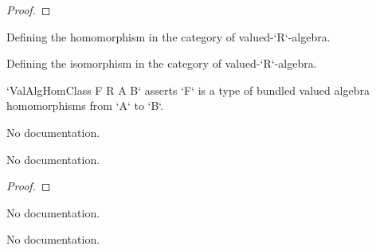 \begin{definition}
\begin{proof}
    \leanok
\end{proof}

\begin{definition}\label{ValAlgHom}
        \leanok
                Defining the homomorphism in the category of valued-`R`-algebra.
    \end{definition}

\begin{definition}\label{ValAlgEquiv}
        \leanok
                Defining the isomorphism in the category of valued-`R`-algebra.
    \end{definition}

\begin{definition}\label{ValAlgHomClass}
        \leanok
                `ValAlgHomClass F R A B` asserts `F` is a type of bundled valued algebra homomorphisms
from `A` to `B`.
    \end{definition}

\begin{definition}\label{ValAlgHom.ofAlgHomClassValRingHomClass}
        \leanok
                No documentation.
    \end{definition}

\begin{theorem}\label{comp_valAlgebraMap}
        \leanok
                No documentation.
    \end{theorem}

\begin{proof}
    \leanok
\end{proof}

\begin{definition}\label{ValAlgEquiv.mk'}
                No documentation.
    \end{definition}

\begin{theorem}\label{ValAlgEquiv.coe_mk'}
                No documentation.
    \end{theorem}


\end{definition}
